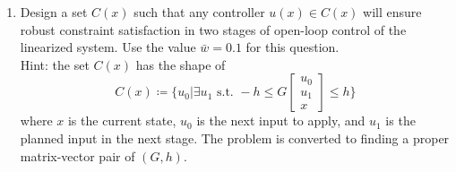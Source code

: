 \begin{enumerate}
    \item Design a set $C(x)$ such that any controller $u(x) \in C(x)$ will ensure robust constraint satisfaction in two stages of open-loop control of the linearized system. 
    Use the value $\bar{w}= 0.1$ for this question. \\
    Hint: the set $C(x)$ has the shape of 
    \begin{equation*}
        C(x) \coloneqq \Big\{ u_0 \Big| \exists u_1 \text{ s.t. } -h \leq G \begin{bmatrix}
            u_0 \\
            u_1 \\
            x
        \end{bmatrix} \leq h \Big\}
    \end{equation*}
    where $x$ is the current state, $u_0$ is the next input to apply, and $u_1$ is the planned input in the next stage. The problem is converted to finding a proper matrix-vector pair of $(G, h)$. 


\end{enumerate}
